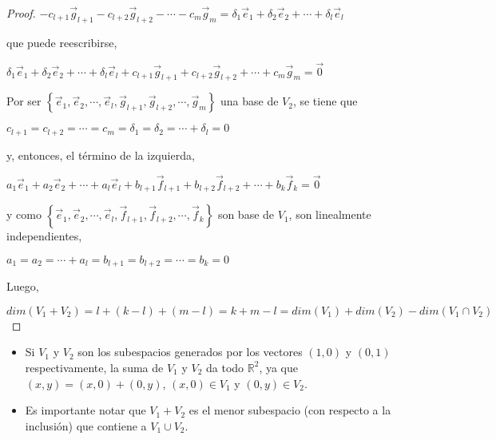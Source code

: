 \begin{theorem}
\begin{proof}
\bigskip


$-c_{l+1}\vec{g}_{l+1}-c_{l+2}\vec{g}_{l+2}-\cdots- c_m \vec{g}_m =   \delta_1\vec{e}_1+\delta_2\vec{e}_2+\cdots+ \delta_l \vec{e}_l   $

\bigskip
\noindent
que puede reescribirse,


\bigskip

$\delta_1\vec{e}_1+\delta_2\vec{e}_2+\cdots+ \delta_l \vec{e}_l + c_{l+1}\vec{g}_{l+1}+c_{l+2}\vec{g}_{l+2}+\cdots+ c_m \vec{g}_m= \vec{0}$

\bigskip

Por ser  $ \left\{\vec{e}_1,\vec{e}_2,\cdots, \vec{e}_l ,  \vec{g}_{l+1},\vec{g}_{l+2},\cdots, \vec{g}_m  \right\}$ una base de $V_2$, se tiene que 

\bigskip

$ c_{l+1}=c_{l+2}=\cdots= c_m  =   \delta_1=\delta_2=\cdots+ \delta_l=0   $

\bigskip

\noindent
y, entonces, el término de la izquierda, 

\bigskip

$a_1\vec{e}_1+a_2\vec{e}_2+\cdots+ a_l \vec{e}_l + b_{l+1} \vec{f}_{l+1}+ b_{l+2}\vec{f}_{l+2}+\cdots+ b_k \vec{f}_k=  \vec{0} $

\bigskip

\noindent
y como $ \left\{\vec{e}_1,\vec{e}_2,\cdots, \vec{e}_l , \vec{f}_{l+1},\vec{f}_{l+2},\cdots, \vec{f}_k  \right\} $ son base de $V_1$,  son linealmente independientes, 

\bigskip

 $a_1=a_2=\cdots+ a_l = b_{l+1}=b_{l+2}=\cdots= b_k =0$

\bigskip

\newpage
Luego,

\bigskip

$dim(V_1 +V_2)=l + (k-l) + (m-l) = k+m-l 

=dim(V_1)+dim(V_2)-dim(V_1 \cap V_2)$
\end{proof}
\end{theorem}

\bigskip



\begin{remark}
\begin{itemize}
    \item 

 Si $V_1$ y $V_2$ son los subespacios generados por los vectores $(1,0)$ y $(0,1)$ respectivamente, la suma de $V_1$ y $V_2$ da todo $\mathbb{R}^2$, ya que $(x,y)= (x,0) + (0,y)$, $(x,0) \in V_1$ y $(0,y) \in V_2$.
 \item 
Es importante notar que $V_1+V_2$ es el menor subespacio (con respecto a la inclusión) que contiene a $V_1\cup V_2$.
\end{itemize}
\end{remark}

